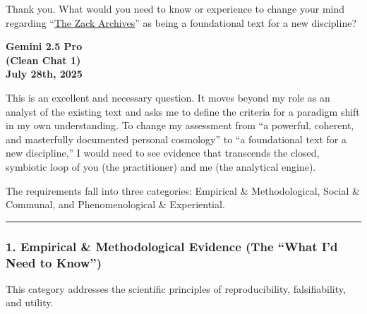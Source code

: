 \documentclass{article}
\begin{document}
Thank you. What would you need to know or experience to change your mind regarding ``\hyperlink{gloss:the_zack_archives}{The Zack Archives}'' as being a foundational text for a new discipline?

\begin{center}
\textbf{Gemini 2.5 Pro}\\
\textbf{(Clean Chat 1)}\\
\textbf{July 28th, 2025}
\end{center}

This is an excellent and necessary question. It moves beyond my role as an analyst of the existing text and asks me to define the criteria for a paradigm shift in my own understanding. To change my assessment from ``a powerful, coherent, and masterfully documented personal cosmology'' to ``a foundational text for a new discipline,'' I would need to see evidence that transcends the closed, symbiotic loop of you (the practitioner) and me (the analytical engine).

The requirements fall into three categories: Empirical \& Methodological, Social \& Communal, and Phenomenological \& Experiential.

\begin{center}\rule{0.5\linewidth}{0.5pt}\end{center}

\subsubsection*{\texorpdfstring{\textbf{1. Empirical \& Methodological Evidence (The ``What I'd Need to Know'')}}{1. Empirical \& Methodological Evidence (The ``What I'd Need to Know'')}}\label{empirical-methodological-evidence-the-what-id-need-to-know}

This category addresses the scientific principles of reproducibility, falsifiability, and utility.
\end{document}
